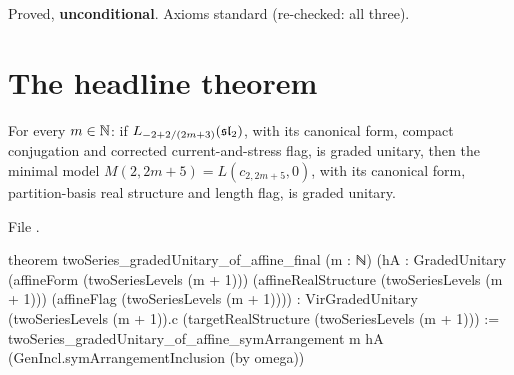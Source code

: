 \begin{status}
Proved, \textbf{unconditional}. Axioms standard (re-checked: all three).
\end{status}

\section{The headline theorem}\label{l29:sec:headline}

\begin{theorem}\label{l29:thm:final}
For every $m\in{\mathbb{N}}$: if $L_{-2+2/(2m+3)}(\mathfrak{sl}_2)$, with its canonical form, compact conjugation and corrected
current-and-stress flag, is graded unitary, then the minimal model $M(2,2m+5)=L(c_{2,2m+5},0)$, with its canonical form,
partition-basis real structure and length flag, is graded unitary.
\end{theorem}

\noindent File .
\begin{leancode}
theorem twoSeries_gradedUnitary_of_affine_final (m : ℕ)
    (hA : GradedUnitary (affineForm (twoSeriesLevels (m + 1)))
      (affineRealStructure (twoSeriesLevels (m + 1))) (affineFlag (twoSeriesLevels (m + 1)))) :
    VirGradedUnitary (twoSeriesLevels (m + 1)).c (targetRealStructure (twoSeriesLevels (m + 1))) :=
  twoSeries_gradedUnitary_of_affine_symArrangement m hA
    (GenIncl.symArrangementInclusion (by omega))
\end{leancode}

